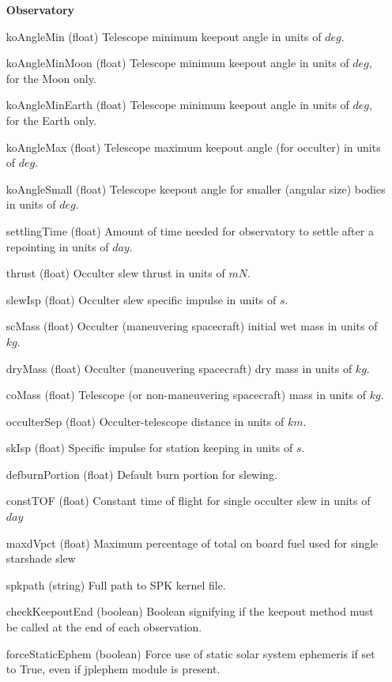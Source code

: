 \documentclass[cleanfoot]{asme2ej}
\begin{document}
\begin{itemize}[leftmargin=1.5in,font={\ttfamily}]
\item[\textbf{Observatory}]
\item[koAngleMin] (float) Telescope minimum keepout angle in units of $deg$. 
\item[koAngleMinMoon] (float) Telescope minimum keepout angle in units of $deg$, for the Moon only.
\item[koAngleMinEarth] (float) Telescope minimum keepout angle in units of $deg$, for the Earth only.
\item[koAngleMax] (float) Telescope maximum keepout angle (for occulter) in units of $deg$. 
\item[koAngleSmall] (float) Telescope keepout angle for smaller (angular size) bodies in units of $deg$.
\item[settlingTime] (float) Amount of time needed for observatory to settle after a repointing in units of $ day $.
\item[thrust] (float) Occulter slew thrust in units of $ mN $.
\item[slewIsp] (float) Occulter slew specific impulse in units of $ s $.
\item[scMass] (float) Occulter (maneuvering spacecraft) initial wet mass in units of $ kg $. 
\item[dryMass] (float) Occulter (maneuvering spacecraft) dry mass in units of $ kg $. 
\item[coMass] (float) Telescope (or non-maneuvering spacecraft) mass in units of $ kg $. 
\item[occulterSep] (float) Occulter-telescope distance in units of $ km $. 
\item[skIsp] (float) Specific impulse for station keeping in units of $ s $. 
\item[defburnPortion] (float) Default burn portion for slewing.
\item[constTOF] (float) Constant time of flight for single occulter slew in units of $ day $
\item[maxdVpct] (float) Maximum percentage of total on board fuel used for single starshade slew
\item[spkpath] (string) Full path to SPK kernel file.
\item[checkKeepoutEnd] (boolean) Boolean signifying if the keepout method must be called at the end of each observation.
\item[forceStaticEphem]  (boolean) Force use of static solar system ephemeris if set to True, even if jplephem module is present.


\end{itemize}
\end{document}
